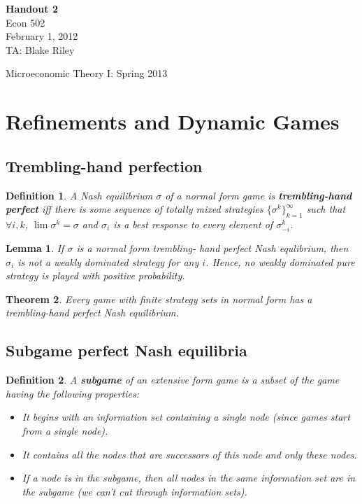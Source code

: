 \documentclass[letter, 10pt]{article}
\newtheorem{definition}{Definition}[section]
\newtheorem{theorem}{Theorem}[section]
\newtheorem{lemma}[theorem]{Lemma}
\begin{document}
\begin{spacing}{1.1}

\noindent
\textbf{Handout 2} \\
Econ 502 \\
February 1, 2012 \\
TA: Blake Riley \\

\begin{center}
{\Large Microeconomic Theory I: Spring 2013}
\end{center}

\section{Refinements and Dynamic Games}

\subsection{Trembling-hand perfection}

\begin{definition}
  A Nash equilibrium $\sigma$ of a normal form game is
  \textbf{trembling-hand perfect} iff there is some sequence of totally
  mixed strategies $\{\sigma^k\}_{k=1}^\infty$ such that $\forall i,k$,
  $\lim \sigma^k = \sigma$ and $\sigma_i$ is a best response to every
  element of $\sigma_{-i}^k$.
\end{definition}

\begin{lemma}
  If $\sigma$ is a normal form trembling- hand perfect Nash equlibrium, then
  $\sigma_i$ is not a weakly dominated strategy for any $i$. Hence, no weakly
  dominated pure strategy is played with positive probability.
\end{lemma}

\begin{theorem}
  Every game with finite strategy sets in normal form has a trembling-hand
  perfect Nash equilibrium.
\end{theorem}

\subsection{Subgame perfect Nash equilibria}

\begin{definition}
  A \textbf{subgame} of an extensive form game is a subset of the
  game having the following properties:
  \begin{itemize}
  \item It begins with an information set containing a
    single node (since games start from a single node).
  \item It contains all the nodes that are successors of
    this node and only these nodes.
  \item If a node is in the subgame, then all nodes in
    the same information set are in the subgame (we can't
    cut through information sets).
  \end{itemize}
\end{definition}


\end{spacing}
\end{document}
